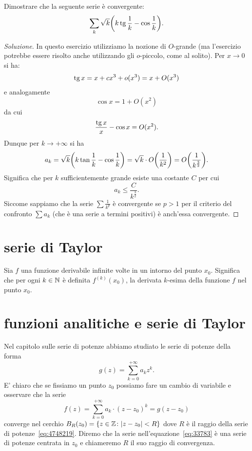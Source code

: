 \begin{exercise}
  Dimostrare che la seguente serie è convergente:
  \[
    \sum_k \sqrt{k} {\left( k\operatorname{tg}{\frac 1 k} - \cos \frac 1 k \right)}.
  \]
\end{exercise}
\begin{proof}[Soluzione]
In questo esercizio utilizziamo la nozione di $O$-grande (ma l'esercizio potrebbe essere risolto anche utilizzando gli $o$-piccolo, come al solito).
Per $x\to 0$ si ha: %
\[
  \operatorname{tg} x = x + c x^3 + o(x^3) = x + O(x^3)
\]
e analogamente
\[
  \cos x = 1 + O(x^2)
\]
da cui
\[
  \frac{\operatorname{tg} x}{x} - \cos x = O(x^2).
\]
Dunque per $k\to +\infty$ si ha
\[
  a_k = \sqrt{k} {\left( k\tan{\frac 1 k} - \cos \frac 1 k \right)}
   = \sqrt{k} \cdot O{\left( \frac 1 {k^2} \right)} = O{\left( \frac 1 {k^{\frac 3 2}} \right)}.
\]
Significa che per $k$ sufficientemente grande esiste una costante $C$
per cui
\[
  a_k \le \frac{C}{k^{\frac 3 2}}.
\]
Siccome sappiamo che la serie $\sum \frac{1}{k^p}$ è convergente
se $p>1$ per il criterio del confronto $\sum a_k$ (che è una serie a termini positivi) è anch'essa convergente.
\end{proof}


\section{serie di Taylor}

Sia $f$ una funzione derivabile infinite 
volte in un intorno del punto $x_0$.
Significa che per ogni $k\in {\mathbb N}$ 
è definita $f^{(k)}(x_0)$, la derivata $k$-esima 
della funzione $f$ nel punto $x_0$.


\section{funzioni analitiche e serie di Taylor}


Nel capitolo sulle serie di potenze abbiamo studiato le serie di potenze
della forma
\begin{equation}\label{eq:4748219}
    g(z) = \sum_{k=0}^{+\infty} a_k z^k.
\end{equation}
E' chiaro che se fissiamo un punto $z_0$ possiamo fare un cambio di variabile
e osservare che la serie
\begin{equation}\label{eq:33783}
  f(z) = \sum_{k=0}^{+\infty} a_k \cdot(z-z_0)^k = g(z-z_0)
\end{equation}
converge nel cerchio $B_R(z_0) = {\left\{ z \in {\mathbb Z}\colon {\left|z-z_0\right|}< R \right\}}$
dove $R$ è il raggio della serie di potenze~\eqref{eq:4748219}.
Diremo che la serie nell'equazione~\eqref{eq:33783} è una
serie di potenze centrata in $z_0$ e chiameremo $R$ il suo raggio di convergenza.

